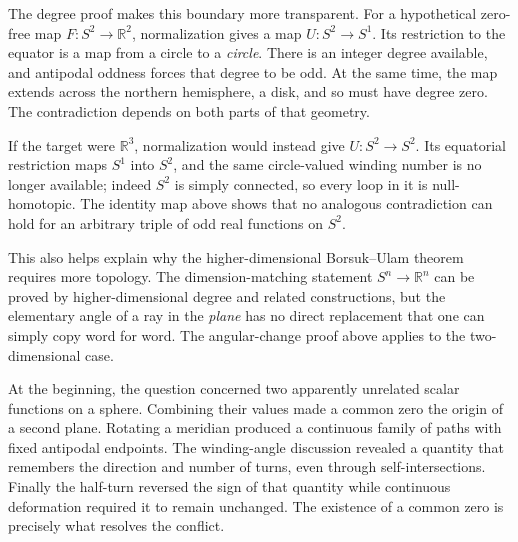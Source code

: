 The degree proof makes this boundary more transparent. For a hypothetical zero-free map \(F:S^2\to\mathbb R^2\), normalization gives a map \(U:S^2\to S^1\). Its restriction to the equator is a map from a circle to a \emph{circle}. There is an integer degree available, and antipodal oddness forces that degree to be odd. At the same time, the map extends across the northern hemisphere, a disk, and so must have degree zero. The contradiction depends on both parts of that geometry.

If the target were \(\mathbb R^3\), normalization would instead give \(U:S^2\to S^2\). Its equatorial restriction maps \(S^1\) into \(S^2\), and the same circle-valued winding number is no longer available; indeed \(S^2\) is simply connected, so every loop in it is null-homotopic. The identity map above shows that no analogous contradiction can hold for an arbitrary triple of odd real functions on \(S^2\).

This also helps explain why the higher-dimensional Borsuk--Ulam theorem requires more topology. The dimension-matching statement \(S^n\to\mathbb R^n\) can be proved by higher-dimensional degree and related constructions, but the elementary angle of a ray in the \emph{plane} has no direct replacement that one can simply copy word for word. The angular-change proof above applies to the two-dimensional case.

At the beginning, the question concerned two apparently unrelated scalar functions on a sphere. Combining their values made a common zero the origin of a second plane. Rotating a meridian produced a continuous family of paths with fixed antipodal endpoints. The winding-angle discussion revealed a quantity that remembers the direction and number of turns, even through self-intersections. Finally the half-turn reversed the sign of that quantity while continuous deformation required it to remain unchanged. The existence of a common zero is precisely what resolves the conflict.
